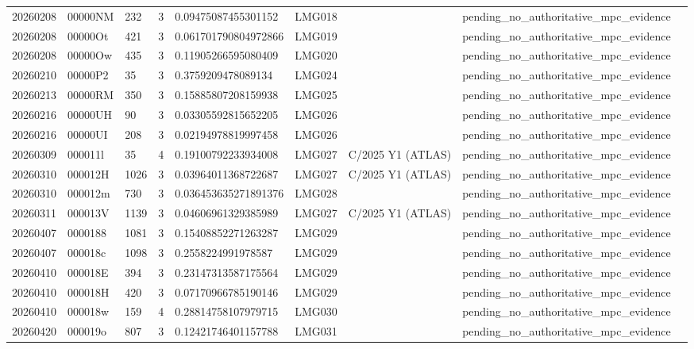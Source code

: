 \begin{longtable}{lllrlllll}
20260208 & 00000NM & 232 & 3 & 0.09475087455301152 & LMG018 &  & pending\_no\_authoritative\_mpc\_evidence &  \\
20260208 & 00000Ot & 421 & 3 & 0.061701790804972866 & LMG019 &  & pending\_no\_authoritative\_mpc\_evidence &  \\
20260208 & 00000Ow & 435 & 3 & 0.11905266595080409 & LMG020 &  & pending\_no\_authoritative\_mpc\_evidence &  \\
20260210 & 00000P2 & 35 & 3 & 0.3759209478089134 & LMG024 &  & pending\_no\_authoritative\_mpc\_evidence &  \\
20260213 & 00000RM & 350 & 3 & 0.15885807208159938 & LMG025 &  & pending\_no\_authoritative\_mpc\_evidence &  \\
20260216 & 00000UH & 90 & 3 & 0.03305592815652205 & LMG026 &  & pending\_no\_authoritative\_mpc\_evidence &  \\
20260216 & 00000UI & 208 & 3 & 0.02194978819997458 & LMG026 &  & pending\_no\_authoritative\_mpc\_evidence &  \\
20260309 & 000011l & 35 & 4 & 0.19100792233934008 & LMG027 & C/2025 Y1 (ATLAS) & pending\_no\_authoritative\_mpc\_evidence &  \\
20260310 & 000012H & 1026 & 3 & 0.03964011368722687 & LMG027 & C/2025 Y1 (ATLAS) & pending\_no\_authoritative\_mpc\_evidence &  \\
20260310 & 000012m & 730 & 3 & 0.036453635271891376 & LMG028 &  & pending\_no\_authoritative\_mpc\_evidence &  \\
20260311 & 000013V & 1139 & 3 & 0.04606961329385989 & LMG027 & C/2025 Y1 (ATLAS) & pending\_no\_authoritative\_mpc\_evidence &  \\
20260407 & 0000188 & 1081 & 3 & 0.15408852271263287 & LMG029 &  & pending\_no\_authoritative\_mpc\_evidence &  \\
20260407 & 000018c & 1098 & 3 & 0.2558224991978587 & LMG029 &  & pending\_no\_authoritative\_mpc\_evidence &  \\
20260410 & 000018E & 394 & 3 & 0.23147313587175564 & LMG029 &  & pending\_no\_authoritative\_mpc\_evidence &  \\
20260410 & 000018H & 420 & 3 & 0.07170966785190146 & LMG029 &  & pending\_no\_authoritative\_mpc\_evidence &  \\
20260410 & 000018w & 159 & 4 & 0.28814758107979715 & LMG030 &  & pending\_no\_authoritative\_mpc\_evidence &  \\
20260420 & 000019o & 807 & 3 & 0.12421746401157788 & LMG031 &  & pending\_no\_authoritative\_mpc\_evidence &  \\

\end{longtable}
